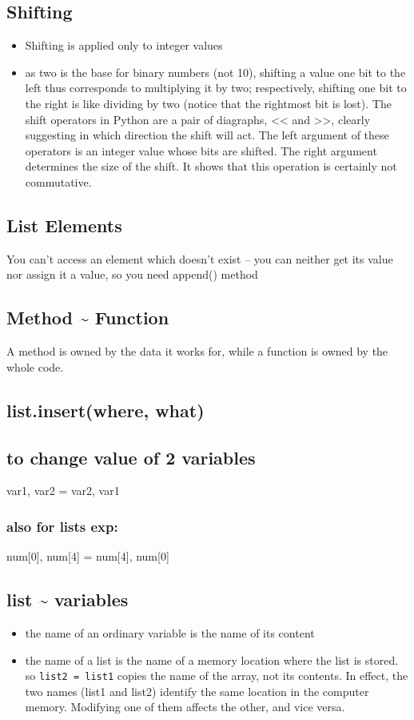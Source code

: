 \documentclass[11pt]{article}
\begin{document}
\subsection{Shifting}
\label{sec:org7a575e4}
\begin{itemize}
\item Shifting is applied only to integer values
\item as two is the base for binary numbers (not 10), shifting a value one
bit to the left thus corresponds to multiplying it by two;
respectively, shifting one bit to the right is like dividing by two
(notice that the rightmost bit is lost).  The shift operators in
Python are a pair of diagraphs, << and >>, clearly suggesting in
which direction the shift will act.  The left argument of these
operators is an integer value whose bits are shifted. The right
argument determines the size of the shift. It shows that this
operation is certainly not commutative.
\end{itemize}
\subsection{List Elements}
\label{sec:org0248557}
You can’t access an element which doesn’t exist – you can neither get
its value nor assign it a value, so you need append() method
\subsection{Method \textasciitilde{} Function}
\label{sec:orgd872854}
A method is owned by the data it works for, while a function is owned
by the whole code.
\subsection{list.insert(where, what)}
\label{sec:org8992956}
\subsection{to change value of 2 variables}
\label{sec:orgc3939db}
var1, var2 = var2, var1
\subsubsection{also for lists exp:}
\label{sec:orgdd289ba}
num[0], num[4] = num[4], num[0]
\subsection{list \textasciitilde{} variables}
\label{sec:orge783669}
\begin{itemize}
\item the name of an ordinary variable is the name of its content
\item the name of a list is the name of a memory location where the list
is stored. so \texttt{list2 = list1} copies the name of the array, not its
contents. In effect, the two names (list1 and list2) identify the
same location in the computer memory. Modifying one of them affects
the other, and vice versa.
\end{itemize}
\end{document}
